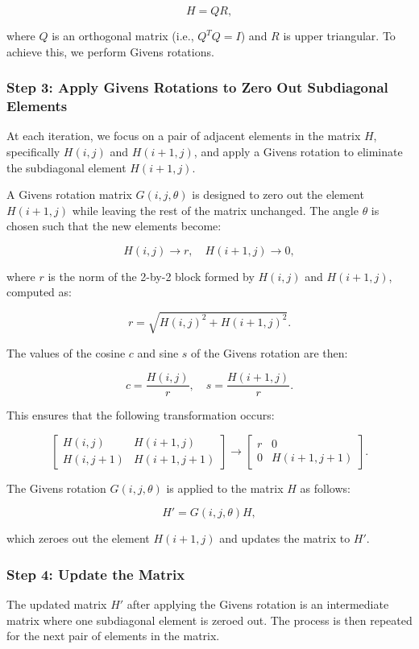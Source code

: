 \documentclass[12pt]{article}
\begin{document}
\[
H = Q R,
\]

where \( Q \) is an orthogonal matrix (i.e., \( Q^T Q = I \)) and \( R \) is upper triangular. To achieve this, we perform Givens rotations.

\subsubsection{Step 3: Apply Givens Rotations to Zero Out Subdiagonal Elements}
At each iteration, we focus on a pair of adjacent elements in the matrix \( H \), specifically \( H(i, j) \) and \( H(i+1, j) \), and apply a Givens rotation to eliminate the subdiagonal element \( H(i+1, j) \).

A Givens rotation matrix \( G(i, j, \theta) \) is designed to zero out the element \( H(i+1, j) \) while leaving the rest of the matrix unchanged. The angle \( \theta \) is chosen such that the new elements become:

\[
H(i, j) \rightarrow r, \quad H(i+1, j) \rightarrow 0,
\]

where \( r \) is the norm of the 2-by-2 block formed by \( H(i, j) \) and \( H(i+1, j) \), computed as:

\[
r = \sqrt{H(i, j)^2 + H(i+1, j)^2}.
\]

The values of the cosine \( c \) and sine \( s \) of the Givens rotation are then:

\[
c = \frac{H(i, j)}{r}, \quad s = \frac{H(i+1, j)}{r}.
\]

This ensures that the following transformation occurs:

\[
\begin{bmatrix} 
H(i, j) & H(i+1, j) \\
H(i, j+1) & H(i+1, j+1)
\end{bmatrix}
\longrightarrow
\begin{bmatrix}
r & 0 \\
0 & H(i+1, j+1)
\end{bmatrix}.
\]

The Givens rotation \( G(i, j, \theta) \) is applied to the matrix \( H \) as follows:

\[
H' = G(i, j, \theta) H,
\]

which zeroes out the element \( H(i+1, j) \) and updates the matrix to \( H' \).

\subsubsection{Step 4: Update the Matrix}
The updated matrix \( H' \) after applying the Givens rotation is an intermediate matrix where one subdiagonal element is zeroed out. The process is then repeated for the next pair of elements in the matrix.
\end{document}
